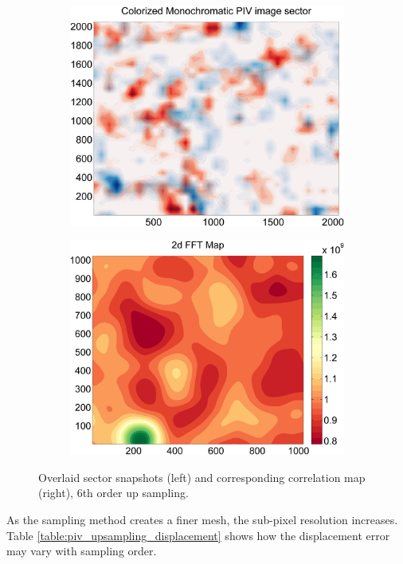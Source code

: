 \begin{figure}[H]
	\begin{subfigure}{.49\textwidth}
		\centering
		\includegraphics[width=.9\linewidth]{figs/piv_method/pive-fig_order6}
	\end{subfigure} 
	\begin{subfigure}{.49\textwidth}
		\centering
		\includegraphics[width=.9\linewidth]{figs/piv_method/pive_fft_order6}
	\end{subfigure}	
	\caption{Overlaid sector snapshots (left) and corresponding correlation 
		map (right), 6th order up sampling.}
	\label{fig:piv_sector_overlay_fft_6up}
\end{figure}

As the sampling method creates a finer mesh, the sub-pixel resolution 
increases. Table \ref{table:piv_upsampling_displacement} shows how the 
displacement error may vary with sampling order.

